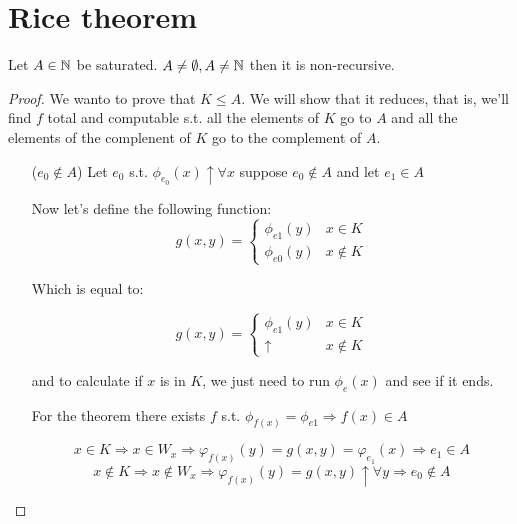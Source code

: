 \section {Rice theorem}

\begin{theorem}
  Let $ A \in \mathbb{N} $ be saturated. $ A \neq \emptyset, A \neq \mathbb{N} $
  then it is non-recursive.
\end{theorem}

\begin{proof}
  We wanto to prove that $ K \leq A $. We will show that it reduces,
  that is, we'll find $f$ total and computable s.t. all the elements
  of $K$ go to $A$ and all the elements of the complenent of $K$ go to
  the complement of $A$.

  \begin{itemize}
  \item[($e_0 \notin A$)]
    Let $ e_0$ s.t. $ \phi_{e_0}(x)\uparrow\forall x $ suppose
    $ e_0\notin A $ and let $ e_1\in A $
    
    Now let's define the following function:
    \begin{equation*}
      g(x,y) = \begin{cases}
        \phi_{e1}(y) & x \in K \\
        \phi_{e0}(y) & x \notin K
      \end{cases}
    \end{equation*}

    Which is equal to:

    \begin{equation*}
      g(x,y) =
      \begin{cases}
        \phi_{e1}(y) & x \in K \\
        \uparrow & x \notin K
      \end{cases}
    \end{equation*}

    and to calculate if $x$ is in $K$, we just need to run $ \phi_e(x) $
    and see if it ends.

    For the \smn theorem there exists $f$ s.t.
    $ \phi_{f(x)} = \phi_{e1} \Rightarrow f(x)\in A$

    \begin{equation}\label{eq:one14}
      x \in K
      \Rightarrow x \in W_x
      \Rightarrow \varphi_{f(x)}(y) = g(x,y) = \varphi_{e_1}(x)
      \Rightarrow e_1 \in A
    \end{equation}
    \begin{equation}\label{eq:two14}
      x \notin K
      \Rightarrow x \notin W_x
      \Rightarrow \varphi_{f(x)}(y) = g(x,y)\uparrow \forall y
      \Rightarrow e_0 \notin A
    \end{equation}


\end{itemize}
\end{proof}

